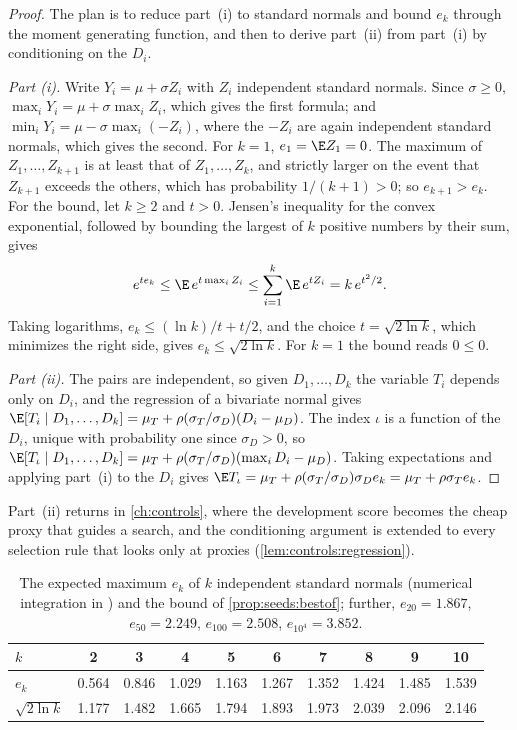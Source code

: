 \begin{refsection}
\begin{proof}
The plan is to reduce part~(i) to standard normals and bound $e_k$ through the moment generating function, and then to derive part~(ii) from part~(i) by conditioning on the $D_i$.

\emph{Part (i).} Write $Y_i=\mu+\sigma Z_i$ with $Z_i$ independent standard normals. Since $\sigma\ge0$, $\max_iY_i=\mu+\sigma\max_iZ_i$, which gives the first formula; and $\min_iY_i=\mu-\sigma\max_i(-Z_i)$, where the $-Z_i$ are again independent standard normals, which gives the second. For $k=1$, $e_1=\E Z_1=0$. The maximum of $Z_1,\dots,Z_{k+1}$ is at least that of $Z_1,\dots,Z_k$, and strictly larger on the event that $Z_{k+1}$ exceeds the others, which has probability $1/(k+1)>0$; so $e_{k+1}>e_k$. For the bound, let $k\ge2$ and $t>0$. Jensen's inequality for the convex exponential, followed by bounding the largest of $k$ positive numbers by their sum, gives
\[
e^{te_k}\le\E\,e^{t\max_iZ_i}\le\sum_{i=1}^k\E\,e^{tZ_i}=k\,e^{t^2/2}.
\]
Taking logarithms, $e_k\le(\ln k)/t+t/2$, and the choice $t=\sqrt{2\ln k}$, which minimizes the right side, gives $e_k\le\sqrt{2\ln k}$. For $k=1$ the bound reads $0\le0$.

\emph{Part (ii).} The pairs are independent, so given $D_1,\dots,D_k$ the variable $T_i$ depends only on $D_i$, and the regression of a bivariate normal gives $\E[T_i\mid D_1,\dots,D_k]=\mu_T+\rho(\sigma_T/\sigma_D)(D_i-\mu_D)$. The index $\iota$ is a function of the $D_i$, unique with probability one since $\sigma_D>0$, so $\E[T_\iota\mid D_1,\dots,D_k]=\mu_T+\rho(\sigma_T/\sigma_D)(\max_iD_i-\mu_D)$. Taking expectations and applying part~(i) to the $D_i$ gives $\E T_\iota=\mu_T+\rho(\sigma_T/\sigma_D)\sigma_De_k=\mu_T+\rho\sigma_Te_k$.
\end{proof}

Part~(ii) returns in \cref{ch:controls}, where the development score becomes the cheap proxy that guides a search, and the conditioning argument is extended to every selection rule that looks only at proxies (\cref{lem:controls:regression}).

\begin{table}[t]
\centering\small
\begin{tabular}{l*{9}{c}}
\toprule
$k$ & 2 & 3 & 4 & 5 & 6 & 7 & 8 & 9 & 10\\
\midrule
$e_k$ & 0.564 & 0.846 & 1.029 & 1.163 & 1.267 & 1.352 & 1.424 & 1.485 & 1.539\\
$\sqrt{2\ln k}$ & 1.177 & 1.482 & 1.665 & 1.794 & 1.893 & 1.973 & 2.039 & 2.096 & 2.146\\
\bottomrule
\end{tabular}
\caption{The expected maximum $e_k$ of $k$ independent standard normals (numerical integration in ) and the bound of \cref{prop:seeds:bestof}; further, $e_{20}=1.867$, $e_{50}=2.249$, $e_{100}=2.508$, $e_{10^4}=3.852$.}
\label{tab:seeds:ek}
\end{table}


\end{refsection}
